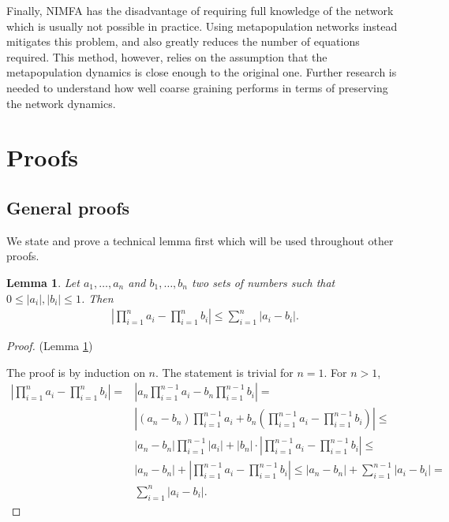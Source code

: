 \documentclass{article}
\newcommand{\1}[1]{{\mathds{1}}_{\left\{#1\right\}}}
\newtheorem{lemma}{Lemma}
\begin{document}
	Finally, NIMFA has the disadvantage of requiring full knowledge of the network which is usually not possible in practice. Using metapopulation networks instead mitigates this problem, and also greatly reduces the number of equations required. This method, however, relies on the assumption that the metapopulation dynamics is close enough to the original one. Further research is needed to understand how well coarse graining performs in terms of preserving the network dynamics.

	
	
	\section{Proofs}
	\label{s:proofs}
	
	\subsection{General proofs}
	
	We state and prove a technical lemma first which will be used throughout other proofs.
	
	\begin{lemma}
		\label{l:technical}
		Let $a_{1},\dots,a_{n}$ and $b_{1},\dots,b_{n}$ two sets of numbers such that $0 \leq \left|a_i \right|, \left|b_i \right| \leq 1$. Then
		\begin{align*}
			\left|\prod_{i=1}^{n}a_{i}-\prod_{i=1}^n b_i \right| \leq \sum_{i=1}^n \left|a_i-b_i \right|.
		\end{align*}
	\end{lemma}
	
	\begin{proof}(Lemma \ref{l:technical})
		
		The proof is by induction on $n$. The statement is trivial for $n=1$. For $n>1$,
		\begin{align*}
			\left|\prod_{i=1}^{n}a_{i}-\prod_{i=1}^n b_i \right| =&\left|a_n\prod_{i=1}^{n-1}a_{i}-b_n\prod_{i=1}^{n-1} b_i \right| =\\
			&\left|\left(a_n -b_n\right)\prod_{i=1}^{n-1}a_{i}+b_n\left(\prod_{i=1}^{n-1}a_{i}-\prod_{i=1}^{n-1} b_i \right) \right| \leq \\
			&\left|a_n -b_n\right|\prod_{i=1}^{n-1}\left|a_{i}\right|+\left|b_n\right| \cdot\left|\prod_{i=1}^{n-1}a_{i}-\prod_{i=1}^{n-1} b_i \right|  \leq \\
			&\left|a_n -b_n\right|+\left|\prod_{i=1}^{n-1}a_{i}-\prod_{i=1}^{n-1} b_i \right|  \leq \left|a_n -b_n\right|+\sum_{i=1}^{n-1}\left|a_i-b_i \right|=\\
			&\sum_{i=1}^{n}\left|a_i-b_i \right|.
		\end{align*}
	\end{proof}
	
\end{document}
